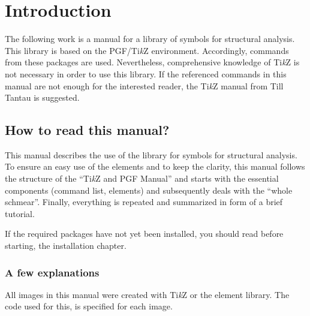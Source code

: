 \documentclass[%
  a4paper,
  BCOR=20mm,
  numbers=noenddot,
  twoside,
  parskip=half,
  openright,
  version=last,
]{scrreprt}
\newcommand{\tikzsym}{Ti\emph{k}Z }
\begin{document}

\chapter{Introduction}
\label{chap:einleitung}

The following work is a manual for a library of symbols for structural analysis. This library is based on the PGF/\tikzsym environment. Accordingly, commands from these packages are used. Nevertheless, comprehensive knowledge of \tikzsym is not necessary in order to use this library. If the referenced commands in this manual are not enough for the interested reader, the \tikzsym manual from Till Tantau is suggested.



\section{How to read this manual?}

This manual describes the use of the library for symbols for structural analysis. To ensure an easy use of the elements and to keep the clarity, this manual follows the structure of the ``\tikzsym and PGF Manual'' and starts with the essential components (command list, elements) and subsequently deals with the ``whole schmear''. Finally, everything is repeated and summarized in form of a brief tutorial.  

If the required packages have not yet been installed, you should read before starting, the installation chapter.

\subsection{A few explanations} All images in this manual were created with
\tikzsym or the element library. The code used for this, is specified for each
image.
\end{document}
